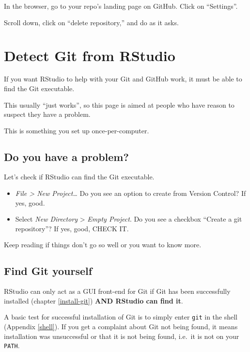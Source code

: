 \documentclass[
]{book}
\providecommand{\tightlist}{%
  \setlength{\itemsep}{0pt}\setlength{\parskip}{0pt}}
\begin{document}
In the browser, go to your repo's landing page on GitHub.
Click on ``Settings''.

Scroll down, click on ``delete repository,'' and do as it asks.

\chapter{Detect Git from RStudio}\label{rstudio-see-git}

If you want RStudio to help with your Git and GitHub work, it must be able to find the Git executable.

This usually ``just works'', so this page is aimed at people who have reason to suspect they have a problem.

This is something you set up once-per-computer.

\section{Do you have a problem?}\label{do-you-have-a-problem}

Let's check if RStudio can find the Git executable.

\begin{itemize}
\tightlist
\item
  \emph{File \textgreater{} New Project\ldots{}} Do you see an option to create from Version Control? If yes, good.
\item
  Select \emph{New Directory} \textgreater{} \emph{Empty Project}. Do you see a checkbox ``Create a git repository''? If yes, good, CHECK IT.
\end{itemize}

Keep reading if things don't go so well or you want to know more.

\section{Find Git yourself}\label{find-git-yourself}

RStudio can only act as a GUI front-end for Git if Git has been successfully installed (chapter \ref{install-git}) \textbf{AND RStudio can find it}.

A basic test for successful installation of Git is to simply enter \texttt{git} in the shell (Appendix \ref{shell}).
If you get a complaint about Git not being found, it means installation was unsuccessful or that it is not being found, i.e.~it is not on your \texttt{PATH}.
\end{document}

